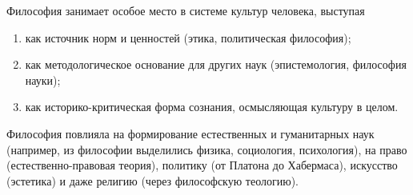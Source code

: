 Философия занимает особое место в системе культур человека, выступая
\begin{enumerate}
	\item как источник норм и ценностей (этика, политическая философия);
	\item как методологическое основание для других наук (эпистемология, философия науки);
	\item как историко-критическая форма сознания, осмысляющая культуру в целом.
\end{enumerate}
Философия повлияла на формирование естественных и гуманитарных наук (например, из философии выделились физика, социология, психология), на право (естественно-правовая теория), политику (от Платона до Хабермаса), искусство (эстетика) и даже религию (через философскую теологию).
